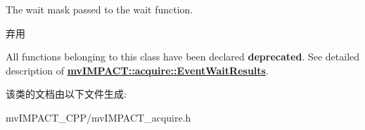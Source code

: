 The wait mask passed to the wait function. 

\begin{DoxyRefDesc}{弃用}
\item[\hyperlink{deprecated__deprecated000026}{弃用}]All functions belonging to this class have been declared {\bfseries deprecated}. See detailed description of {\bfseries \hyperlink{classmv_i_m_p_a_c_t_1_1acquire_1_1_event_wait_results}{mv\+I\+M\+P\+A\+C\+T\+::acquire\+::\+Event\+Wait\+Results}}. \end{DoxyRefDesc}


该类的文档由以下文件生成\+:\begin{DoxyCompactItemize}
\item 
mv\+I\+M\+P\+A\+C\+T\+\_\+\+C\+P\+P/mv\+I\+M\+P\+A\+C\+T\+\_\+acquire.\+h\end{DoxyCompactItemize}
